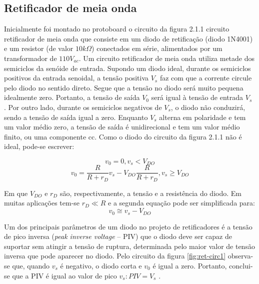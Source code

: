 \documentclass[a4paper]{article} %
\begin{document}
\subsection{Retificador de meia onda}
         Inicialmente foi montado no protoboard o circuito da figura 2.1.1 circuito retificador de meia onda que consiste em um diodo de retificação (diodo 1N4001) e um resistor (de valor $10k\Omega$) conectados em série, alimentados por um transformador de $110V_{ac}$.
         Um circuito retificador de meia onda utiliza metade dos semiciclos da senóide de entrada. Supondo um diodo ideal, durante os semiciclos positivos da entrada senoidal, a tensão positiva $V_s$ faz com que a corrente circule pelo diodo no sentido direto. Segue que a tensão no diodo será muito pequena idealmente zero. Portanto, a tensão de saída $V_0$ será igual à tensão de entrada $V_s$ . Por outro lado, durante os semiciclos negativos de $V_s$, o diodo não conduzirá, sendo a tensão de saída igual a zero. Enquanto $V_s$ alterna em polaridade e tem um valor médio zero, a tensão de saída é unidirecional e tem um valor médio finito, ou uma componente cc.
         Como o diodo do circuito da figura 2.1.1 não é ideal, pode-se escrever:
     
\begin{equation}
v_0=0,       v_s<V_{DO}
\end{equation}
\begin{equation}
v_0=\frac{R}{R+r_D}v_s -V_{DO}\frac{R}{R+r_D},      v_s \geq V_{DO}
\end{equation}


    Em que   $V_{DO}$     e $r_D$ são, respectivamente, a tensão e a resistência do diodo.
         Em muitas aplicações tem-se  $r_D \ll R$           e a segunda equação pode ser simplificada para:
\begin{equation}
v_0 \cong v_s-V_{DO}
\end{equation}


         Um dos principais parâmetros de um diodo no projeto de retificadores é a tensão de pico inversa (\textit{peak inverse voltage} – PIV) que o diodo deve ser capaz de suportar sem atingir a
tensão de ruptura, determinada pelo maior valor de tensão inversa que pode aparecer no diodo. Pelo circuito da figura  \ref{fig:ret-circ1} observa-se que, quando $v_s$ é negativo, o diodo corta e   $v_0$      é
igual a zero. Portanto, conclui-se que a PIV é igual ao valor de pico $v_s:PIV=V_s$ .
\end{document}
